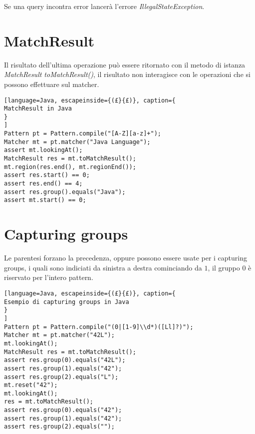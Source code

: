 Se una query incontra error lancerà l'errore \emph{IllegalStateException}.

\section{MatchResult}
Il risultato dell'ultima operazione può essere ritornato con il metodo di
istanza \emph{MatchResult toMatchResult()}, il risultato non interagisce con le
operazioni che si possono effettuare sul matcher.

\begin{lstlisting}[language=Java, escapeinside={(£}{£)}, caption={
MatchResult in Java
}
]
Pattern pt = Pattern.compile("[A-Z][a-z]+");
Matcher mt = pt.matcher("Java Language");
assert mt.lookingAt();
MatchResult res = mt.toMatchResult();
mt.region(res.end(), mt.regionEnd());
assert res.start() == 0;
assert res.end() == 4;
assert res.group().equals("Java");
assert mt.start() == 0;
\end{lstlisting}


\section{Capturing groups}
Le parentesi forzano la precedenza, oppure possono essere usate per i capturing
groups, i quali sono indiciati da sinistra a destra cominciando da $1$, il
gruppo $0$ è riservato per l'intero pattern.

\begin{lstlisting}[language=Java, escapeinside={(£}{£)}, caption={
Esempio di capturing groups in Java
}
]
Pattern pt = Pattern.compile("(0|[1-9]\\d*)([Ll]?)");
Matcher mt = pt.matcher("42L");
mt.lookingAt();
MatchResult res = mt.toMatchResult();
assert res.group(0).equals("42L");
assert res.group(1).equals("42");
assert res.group(2).equals("L");
mt.reset("42");
mt.lookingAt();
res = mt.toMatchResult();
assert res.group(0).equals("42");
assert res.group(1).equals("42");
assert res.group(2).equals("");
\end{lstlisting}

